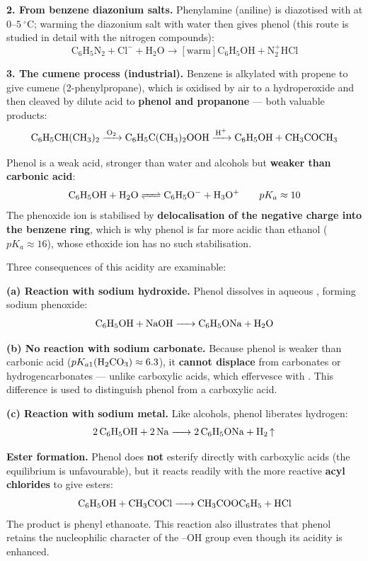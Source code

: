 \documentclass[11pt]{article}
\newcommand{\cle}[1]{{\popxbold\color{popdark}#1}}
\newcounter{popsec}
\newcounter{popsub}
\newcommand{\courssub}[1]{%
  \stepcounter{popsub}%
  \par\vspace{9pt}\noindent{\popxbold\fontsize{11.5}{13}\selectfont\color{popink}{\color{poporange}\thepopsec.\thepopsub}\hspace{6pt}#1}\par\nopagebreak\vspace{4pt}
}
\begin{document}
\textbf{2. From benzene diazonium salts.} Phenylamine (aniline) is diazotised with  at $0$--$\SI{5}{\ensuremath{{}^{\circ}\mathrm{C}}}$; warming the diazonium salt with water then gives phenol (this route is studied in detail with the nitrogen compounds):
\[ \ensuremath{\mathrm{C_{6}H_{5}N_{2}+Cl^{-} + H_{2}O \rightarrow [\text{warm}] C_{6}H_{5}OH + N_{2} ^ + HCl}} \]

\textbf{3. The cumene process (industrial).} Benzene is alkylated with propene to give cumene (2-phenylpropane), which is oxidised by air to a hydroperoxide and then cleaved by dilute acid to \textbf{phenol and propanone} — both valuable products:
\[ \ce{C6H5CH(CH3)2 ->[O2] C6H5C(CH3)2OOH ->[H+] C6H5OH + CH3COCH3} \]

\courssub{Reactions of the --OH Group of Phenol}

\begin{propriete}
Phenol is a \cle{weak acid}, stronger than water and alcohols but \textbf{weaker than carbonic acid}:
\[ \ce{C6H5OH + H2O <=> C6H5O- + H3O+} \qquad pK_a \approx 10 \]
The phenoxide ion  is stabilised by \textbf{delocalisation of the negative charge into the benzene ring}, which is why phenol is far more acidic than ethanol ($pK_a \approx 16$), whose ethoxide ion has no such stabilisation.
\end{propriete}

Three consequences of this acidity are examinable:

\textbf{(a) Reaction with sodium hydroxide.} Phenol dissolves in aqueous , forming sodium phenoxide:
\[ \ce{C6H5OH + NaOH -> C6H5ONa + H2O} \]

\textbf{(b) No reaction with sodium carbonate.} Because phenol is weaker than carbonic acid ($pK_{a1}(\ce{H2CO3}) \approx 6.3$), it \textbf{cannot displace } from carbonates or hydrogencarbonates — unlike carboxylic acids, which effervesce with . This difference is used to distinguish phenol from a carboxylic acid.

\textbf{(c) Reaction with sodium metal.} Like alcohols, phenol liberates hydrogen:
\[ \ce{2C6H5OH + 2Na -> 2C6H5ONa + H2 ^} \]

\textbf{Ester formation.} Phenol does \textbf{not} esterify directly with carboxylic acids (the equilibrium is unfavourable), but it reacts readily with the more reactive \textbf{acyl chlorides} to give esters:
\[ \ce{C6H5OH + CH3COCl -> CH3COOC6H5 + HCl} \]
The product is phenyl ethanoate. This reaction also illustrates that phenol retains the nucleophilic character of the --OH group even though its acidity is enhanced.
\end{document}
